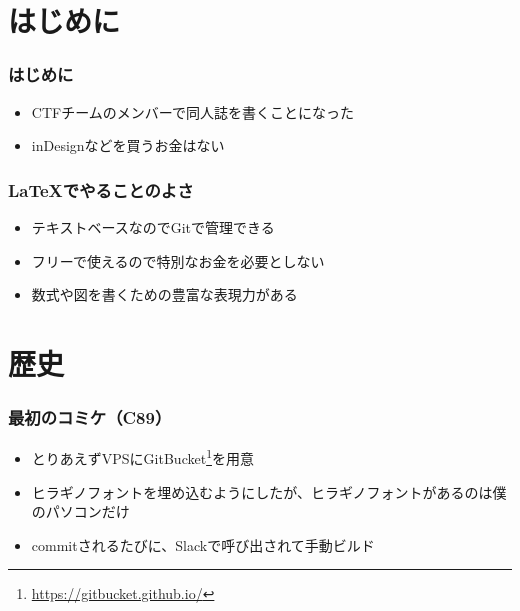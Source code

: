 \section{はじめに}

\begin{frame}
  \frametitle{はじめに}

  \begin{itemize}
    \item<2-> CTFチームのメンバーで同人誌を書くことになった
    \item<3-> inDesignなどを買うお金はない
  \end{itemize}

  \begin{center}
  \end{center} 
\end{frame}

\begin{frame}
  \frametitle{\LaTeX でやることのよさ}

  \begin{itemize}
    \item<2-> テキストベースなのでGitで管理できる
    \item<3-> フリーで使えるので特別なお金を必要としない
    \item<4-> 数式や図を書くための豊富な表現力がある
  \end{itemize}
\end{frame}

\section{歴史}

\begin{frame}
  \frametitle{最初のコミケ（C89）}

  \begin{itemize}
    \item<2-> とりあえずVPSにGitBucket\footnote[frame]{\url{https://gitbucket.github.io/}}を用意
    \item<3-> ヒラギノフォントを埋め込むようにしたが、ヒラギノフォントがあるのは僕のパソコンだけ
    \item<4-> commitされるたびに、Slackで呼び出されて手動ビルド
  \end{itemize}

  \begin{center}
  \end{center}
\end{frame}

